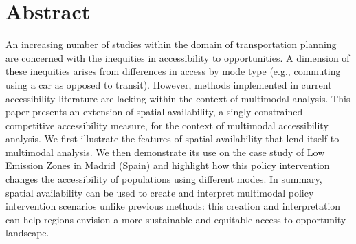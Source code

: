 \documentclass[10pt,letterpaper]{article}
\newcommand{\getIndex}[2]{
  \ForEach{,}{\IfEq{#1}{\thislevelitem}{\number\thislevelcount\ExitForEach}{}}{#2}
}
\newcommand{\getAff}[1]{
  \getIndex{#1}{McMaster,Madrid}
}
\begin{document}
\vspace*{0.2in}


\section*{Abstract}
An increasing number of studies within the domain of transportation
planning are concerned with the inequities in accessibility to
opportunities. A dimension of these inequities arises from differences
in access by mode type (e.g., commuting using a car as opposed to
transit). However, methods implemented in current accessibility
literature are lacking within the context of multimodal analysis. This
paper presents an extension of spatial availability, a
singly-constrained competitive accessibility measure, for the context of
multimodal accessibility analysis. We first illustrate the features of
spatial availability that lend itself to multimodal analysis. We then
demonstrate its use on the case study of Low Emission Zones in Madrid
(Spain) and highlight how this policy intervention changes the
accessibility of populations using different modes. In summary, spatial
availability can be used to create and interpret multimodal policy
intervention scenarios unlike previous methods: this creation and
interpretation can help regions envision a more sustainable and
equitable access-to-opportunity landscape.
\end{document}

